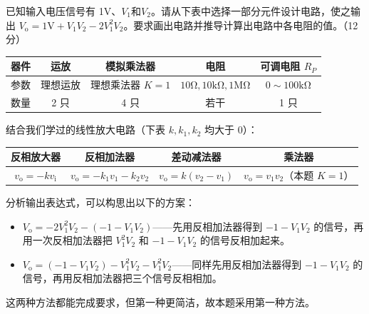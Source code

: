 \documentclass[UTF8]{ctexart}
\newcommand\xb[1]{_\mathrm{#1}}
\begin{document}

{\color{cyan!50!black}
已知输入电压信号有 1V、$V_1$和$V_2$。请从下表中选择一部分元件设计电路，使之输出 $V\xb{o} = \mathrm{1V} + V_1V_2 - 2V_1^2V_2$。要求画出电路并推导计算出电路中各电阻的值。（12分）

\begin{table}[htb]
    \color{cyan!50!black}
    \centering
    \begin{tabular}{ccccc}
    \toprule
        器件 & 运放 & 模拟乘法器 & 电阻 & 可调电阻 $R_P$ \\
    \midrule
        参数 & 理想运放 & 理想乘法器 $K=1$ & $\mathrm{10\Omega, 10k\Omega, 1M\Omega}$ & $0\sim 100\mathrm{k\Omega}$ \\
        数量 & 2 只 & 4 只 & 若干 & 1 只 \\
    \bottomrule
    \end{tabular}
\end{table}
}

结合我们学过的线性放大电路（下表 $k,k_1,k_2$ 均大于 0）：
\begin{table}[htb]
    \centering
    \begin{tabular}{cccc}
    \toprule
        反相放大器 & 反相加法器 & 差动减法器 & 乘法器 \\
    \midrule
        $v\xb{o} = -k v\xb{i}$ & $v\xb{o} = -k_1v_1 - k_2v_2$ & $v\xb{o} = k(v_2 - v_1)$ & $v\xb{o} = v_1 v_2$（本题 $K=1$） \\
    \bottomrule
    \end{tabular}
\end{table}

分析输出表达式，可以构思出以下的方案：
\begin{itemize}[itemsep=0pt, parsep=0pt]
    \item \colorbox{cyan!10}{\textcolor{cyan!50!black}{$V\xb{o} = -2V_1^2 V_2 - (-1-V_1V_2)$}}——先用反相加法器得到 $-1-V_1V_2$ 的信号，再用一次反相加法器把 $V_1^2V_2$ 和 $-1-V_1V_2$ 的信号反相加起来。
    \item $V\xb{o} = (-1-V_1V_2) - V_1^2V_2 - V_1^2V_2$——同样先用反相加法器得到 $-1-V_1V_2$ 的信号，再用反相加法器把三个信号反相相加。
\end{itemize}
这两种方法都能完成要求，但第一种更简洁，故本题采用第一种方法。
\end{document}
